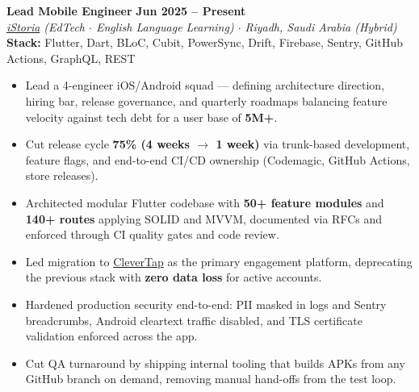 \documentclass[10pt,a4paper]{article}
\newcommand{\workexp}[5]{
    \noindent \textbf{#1} \hfill \textbf{#2} \\
    \textit{#3} \\
    {\small\color{techstack}\textbf{Stack:} #4}
    \vspace{0pt}
    \begin{itemize}[itemsep=2.4pt,parsep=0pt,topsep=2pt,leftmargin=1.5em]
    #5
    \end{itemize}
    \vspace{3pt}
}
\begin{document}
    \workexp{Lead Mobile Engineer}{Jun 2025 -- Present}
    {\href{https://istoria.app/en/}{iStoria} (EdTech $\cdot$ English Language Learning) $\cdot$ Riyadh, Saudi Arabia (Hybrid)}
    {Flutter, Dart, BLoC, Cubit, PowerSync, Drift, Firebase, Sentry, GitHub Actions, GraphQL, REST}
    {
        \item Lead a 4-engineer iOS/Android squad --- defining architecture direction, hiring bar, release governance, and quarterly roadmaps balancing feature velocity against tech debt for a user base of \textbf{5M+}.
    \item Cut release cycle \textbf{75\% (4 weeks $\to$ 1 week)} via trunk-based development, feature flags, and end-to-end CI/CD ownership (Codemagic, GitHub Actions, store releases).
    \item Architected modular Flutter codebase with \textbf{50+ feature modules} and \textbf{140+ routes} applying SOLID and MVVM, documented via RFCs and enforced through CI quality gates and code review.
    \item Led migration to \href{https://clevertap.com/}{CleverTap} as the primary engagement platform, deprecating the previous stack with \textbf{zero data loss} for active accounts.
    \item Hardened production security end-to-end: PII masked in logs and Sentry breadcrumbs, Android cleartext traffic disabled, and TLS certificate validation enforced across the app.
    \item Cut QA turnaround by shipping internal tooling that builds APKs from any GitHub branch on demand, removing manual hand-offs from the test loop.
    }
\end{document}
